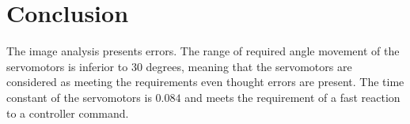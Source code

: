  

	\section*{Conclusion}
	
The image analysis presents errors. The range of required angle movement of the servomotors is inferior to $30$ degrees, meaning that the servomotors are considered as meeting the requirements even thought errors are present. The time constant of the servomotors is $0.084$ and meets the requirement of a fast reaction to a controller command.




